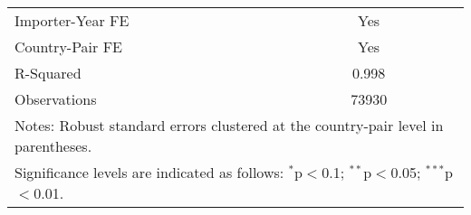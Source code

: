 \begin{table}[htbp]
\begin{adjustbox}{max width=\textwidth}
\begin{tabular}{lcc}
    Importer-Year FE & Yes \\
    Country-Pair FE & Yes \\
    R-Squared & 0.998 \\
    Observations & 73930 \\
    \hline
    \multicolumn{3}{l}{\footnotesize{Notes: Robust standard errors clustered at the country-pair level in parentheses.}} \\
    \multicolumn{3}{l}{\footnotesize{Significance levels are indicated as follows: $^{\ast}$p$<$0.1; $^{\ast\ast}$p$<$0.05; $^{\ast\ast\ast}$p$<$0.01.}} \\
    \end{tabular}
    \end{adjustbox}
\end{table}